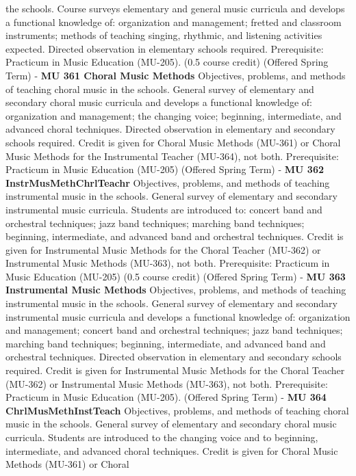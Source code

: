 \documentclass[
  letterpaper,
]{scrbook}
\begin{document}
the schools. Course surveys elementary and general music curricula and
develops a functional knowledge of: organization and management; fretted
and classroom instruments; methods of teaching singing, rhythmic, and
listening activities expected. Directed observation in elementary
schools required. Prerequisite: Practicum in Music Education (MU-205).
(0.5 course credit) (Offered Spring Term) - \textbf{MU 361 Choral Music
Methods} Objectives, problems, and methods of teaching choral music in
the schools. General survey of elementary and secondary choral music
curricula and develops a functional knowledge of: organization and
management; the changing voice; beginning, intermediate, and advanced
choral techniques. Directed observation in elementary and secondary
schools required. Credit is given for Choral Music Methods (MU-361) or
Choral Music Methods for the Instrumental Teacher (MU-364), not both.
Prerequisite: Practicum in Music Education (MU-205) (Offered Spring
Term) - \textbf{MU 362 InstrMusMethChrlTeachr} Objectives, problems, and
methods of teaching instrumental music in the schools. General survey of
elementary and secondary instrumental music curricula. Students are
introduced to: concert band and orchestral techniques; jazz band
techniques; marching band techniques; beginning, intermediate, and
advanced band and orchestral techniques. Credit is given for
Instrumental Music Methods for the Choral Teacher (MU-362) or
Instrumental Music Methods (MU-363), not both. Prerequisite: Practicum
in Music Education (MU-205) (0.5 course credit) (Offered Spring Term) -
\textbf{MU 363 Instrumental Music Methods} Objectives, problems, and
methods of teaching instrumental music in the schools. General survey of
elementary and secondary instrumental music curricula and develops a
functional knowledge of: organization and management; concert band and
orchestral techniques; jazz band techniques; marching band techniques;
beginning, intermediate, and advanced band and orchestral techniques.
Directed observation in elementary and secondary schools required.
Credit is given for Instrumental Music Methods for the Choral Teacher
(MU-362) or Instrumental Music Methods (MU-363), not both. Prerequisite:
Practicum in Music Education (MU-205). (Offered Spring Term) -
\textbf{MU 364 ChrlMusMethInstTeach} Objectives, problems, and methods
of teaching choral music in the schools. General survey of elementary
and secondary choral music curricula. Students are introduced to the
changing voice and to beginning, intermediate, and advanced choral
techniques. Credit is given for Choral Music Methods (MU-361) or Choral
\end{document}
